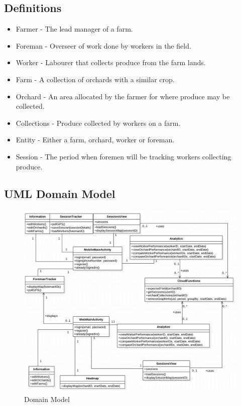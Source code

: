 \documentclass[11pt]{article}
\begin{document}
\subsection{Definitions}
\begin{itemize}
\item Farmer - The lead manager of a farm.
\item Foreman - Overseer of work done by workers in the field.
\item Worker - Labourer that collects produce from the farm lands.
\item Farm - A collection of orchards with a similar crop.
\item Orchard - An area allocated by the farmer for where produce may be collected.
\item Collections - Produce collected by workers on a farm.
\item Entity - Either a farm, orchard, worker or foreman.
\item Session - The period when foremen will be tracking workers collecting produce.
\end{itemize}

\newpage
\subsection{UML Domain Model}
\begin{figure}[h]
 \centering
 \includegraphics[width=12cm, keepaspectratio]{UMLClassDiag.png}
 \caption{Domain Model}
 \label{DomainModel}
\end{figure}
\end{document}

